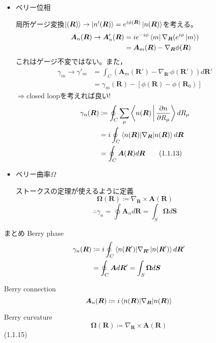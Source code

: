 \documentclass[a4paper,11pt,dvipdfmx]{jsarticle}
\theoremstyle{definition}%
\numberwithin{equation}{section}%
\numberwithin{theorem}{section} %
\begin{document}
\begin{itemize}
  \item ベリー位相
  
  局所ゲージ変換\(\ket{(\bm{R})}\to\ket{n'(\bm{R})}=e^{i\phi(\bm{R})}\ket{n(\bm{R})}\)を考える。
  \begin{align}
    \bm{A}_n(\bm{R})\to \bm{A}'_{n}(\bm{R})&=ie^{-i\phi}\bra{m}\nabla_{\bm{R}}(e^{i\phi}\ket{m}) \\
    &=\bm{A}_m(\bm{R})-\nabla_{\bm{R}}\phi(\bm{R})
  \end{align}
  これはゲージ不変ではない。また，
  \begin{align}
    \gamma_m\to\gamma'_m&=\int_C(\bm{A}_m(\bm{R}')-\nabla_{\bm{R}'}\phi(\bm{R}'))d\bm{R}' \\
    &=\gamma_m(\bm{R})-\left[\phi(\bm{R})-\phi(\bm{R}_0)\right]
  \end{align}
  \(\Longrightarrow\)closed loopを考えれば良い!
  \begin{align}
    \gamma_n(\bm{R})&\coloneq \oint_C\sum_\mu \Braket{n(\bm{R})|\frac{\partial n}{\partial R_\mu}}dR_\mu \\
    &=i\oint_C \braket{n(\bm{R})|\nabla_{\bm{R}}|n(\bm{R})}d\bm{R} \\
    &=\oint_C \bm{A}(\bm{R})d\bm{R}\tag{1.1.13}
  \end{align}

  \item ベリー曲率\(\Omega\) 
  
  ストークスの定理が使えるように定義
  \begin{equation}
    \bm{\Omega}(\bm{R})\coloneq \nabla_{\bm{R}}\times \bm{A}(\bm{R})\tag{1.1.14}
  \end{equation}
  \begin{equation}
    \therefore \gamma_n=\oint\bm{A}_nd\bm{R}=\int_S\bm{\Omega} d\bm{S}
  \end{equation}
\end{itemize}

\begin{mythm}{まとめ}{}
Berry phase
\begin{align}
  \gamma_n(\bm{R})&\coloneq i\oint_C \braket{n(\bm{R}')|\nabla_{\bm{R}'}|n(\bm{R}')}d\bm{R}' \\
  &=\oint_C\bm{A}d\bm{R}'=\int_S\bm{\Omega}d\bm{S}
\end{align}

Berry connection 
\begin{equation}
  \bm{A}_n(\bm{R})\coloneq i\braket{n(\bm{R})|\nabla_{\bm{R}}|n(\bm{R})}
\end{equation}

Berry curvature 
\begin{equation}
  \bm{\Omega}(\bm{R})\coloneq \nabla_{\bm{R}}\times \bm{A}(\bm{R})
\end{equation}
(1.1.15)
\end{mythm}
\end{document}
